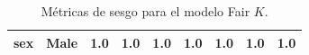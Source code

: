 \documentclass[oneside,openright,titlepage,numbers=noenddot,openany,headinclude,footinclude=true,
cleardoublepage=empty,abstractoff,BCOR=5mm,paper=a4,fontsize=12pt,main=spanish]{scrreprt}
\begin{document}
\begin{table}[H]
{\begin{tabular}{|c|c|c|c|c|c|c|c|c|}
\textbf{sex}                                                      & Male                                                               & {\color[HTML]{3166FF} 1.0}                                       & {\color[HTML]{3166FF} 1.0}                                       & {\color[HTML]{3166FF} 1.0}                                       & {\color[HTML]{3166FF} 1.0}                                       & {\color[HTML]{3166FF} 1.0}                                       & {\color[HTML]{3166FF} 1.0}                                       & {\color[HTML]{3166FF} 1.0}                                       \\ \hline
\end{tabular}
}
\caption{Métricas de sesgo para el modelo Fair $K$.}
\label{tab:sesgofairk}
\end{table}
\end{document}
